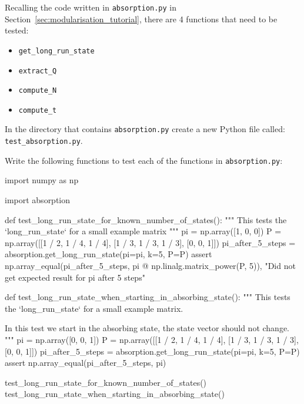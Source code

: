 Recalling the code written in \texttt{absorption.py} in
Section~\ref{sec:modularisation_tutorial},
there are 4 functions that need to be tested:

\begin{itemize}
\item 

\texttt{get\_long\_run\_state}

\item 

\texttt{extract\_Q}

\item 

\texttt{compute\_N}

\item 

\texttt{compute\_t}

\end{itemize}


In the directory that contains \texttt{absorption.py} create a new Python
file called: \texttt{test\_absorption.py}.


Write the following functions to test each of the functions in
\texttt{absorption.py}:

\begin{pyin}
import numpy as np

import absorption

def test_long_run_state_for_known_number_of_states():
    """
    This tests the `long_run_state` for a small example matrix
    """
    pi = np.array([1, 0, 0])
    P = np.array([[1 / 2, 1 / 4, 1 / 4], [1 / 3, 1 / 3, 1 / 3], [0, 0, 1]])
    pi_after_5_steps = absorption.get_long_run_state(pi=pi, k=5, P=P)
    assert np.array_equal(pi_after_5_steps, pi @ np.linalg.matrix_power(P, 5)), "Did not get expected result for pi after 5 steps"


def test_long_run_state_when_starting_in_absorbing_state():
    """
    This tests the `long_run_state` for a small example matrix.

    In this test we start in the absorbing state, the state vector should not
    change.
    """
    pi = np.array([0, 0, 1])
    P = np.array([[1 / 2, 1 / 4, 1 / 4], [1 / 3, 1 / 3, 1 / 3], [0, 0, 1]])
    pi_after_5_steps = absorption.get_long_run_state(pi=pi, k=5, P=P)
    assert np.array_equal(pi_after_5_steps, pi)


test_long_run_state_for_known_number_of_states()
test_long_run_state_when_starting_in_absorbing_state()
\end{pyin}


